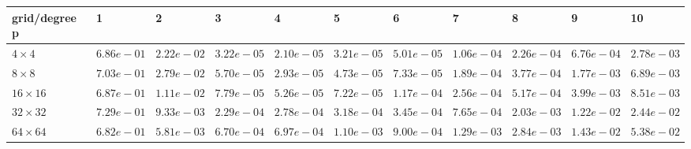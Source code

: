 \begin{tabular}{lllllllllll}
\hline
 grid/degree p   & 1          & 2          & 3          & 4          & 5          & 6          & 7          & 8          & 9          & 10         \\
\hline
 $4 \times 4$    & $6.86e-01$ & $2.22e-02$ & $3.22e-05$ & $2.10e-05$ & $3.21e-05$ & $5.01e-05$ & $1.06e-04$ & $2.26e-04$ & $6.76e-04$ & $2.78e-03$ \\
 $8 \times 8$    & $7.03e-01$ & $2.79e-02$ & $5.70e-05$ & $2.93e-05$ & $4.73e-05$ & $7.33e-05$ & $1.89e-04$ & $3.77e-04$ & $1.77e-03$ & $6.89e-03$ \\
 $16 \times 16$  & $6.87e-01$ & $1.11e-02$ & $7.79e-05$ & $5.26e-05$ & $7.22e-05$ & $1.17e-04$ & $2.56e-04$ & $5.17e-04$ & $3.99e-03$ & $8.51e-03$ \\
 $32 \times 32$  & $7.29e-01$ & $9.33e-03$ & $2.29e-04$ & $2.78e-04$ & $3.18e-04$ & $3.45e-04$ & $7.65e-04$ & $2.03e-03$ & $1.22e-02$ & $2.44e-02$ \\
 $64 \times 64$  & $6.82e-01$ & $5.81e-03$ & $6.70e-04$ & $6.97e-04$ & $1.10e-03$ & $9.00e-04$ & $1.29e-03$ & $2.84e-03$ & $1.43e-02$ & $5.38e-02$ \\
\hline
\end{tabular}